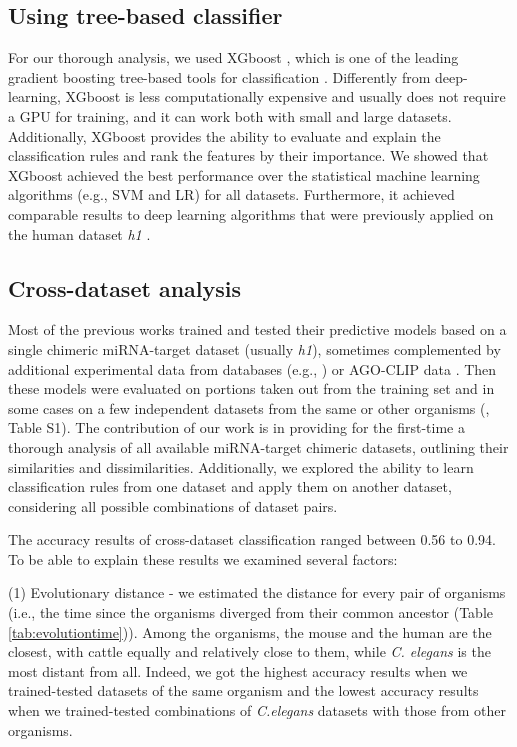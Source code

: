 \documentclass{bmcart}
\begin{document}
\subsection*{Using tree-based classifier} 
For our thorough analysis, we used XGboost \cite{xgboost}, which is one of the leading gradient boosting tree-based tools for classification \cite{nielsen2016tree}. Differently from deep-learning, XGboost is less computationally expensive and usually does not require a GPU for training, and it can work both with small and large datasets. Additionally, XGboost provides the ability to evaluate and explain the classification rules and rank the features by their importance. 
We showed that XGboost achieved the best performance over the statistical machine learning algorithms (e.g., SVM and LR) for all datasets. Furthermore, it achieved comparable results to deep learning algorithms that were previously applied on the human dataset \textit{h1} \cite{wen2018deepmirtar, lee2016deeptarget}.

\subsection*{Cross-dataset analysis}
Most of the previous works trained and tested their predictive models based on a single chimeric miRNA-target dataset (usually \textit{h1}), sometimes complemented by additional experimental data from databases (e.g., \cite{xiao2009mirecords,chou2016mirtarbase}) or AGO-CLIP data \cite{ding2016tarpmir,wen2018deepmirtar,paker2019mirlstm, lu2016learning, pla2018miraw}. Then these models were evaluated on portions taken out from the training set and in some cases on a few independent datasets from the same or other organisms  (, Table S1). 
The contribution of our work is in providing for the first-time a thorough analysis of all available miRNA-target chimeric datasets, outlining their similarities and dissimilarities. Additionally, we explored the ability to learn classification rules from one dataset and apply them on another dataset, considering all possible combinations of dataset pairs.

The accuracy results of cross-dataset classification ranged between 0.56 to 0.94. To be able to explain these results we examined several factors:

(1) Evolutionary distance - we estimated the distance for every pair of organisms (i.e., the time since the organisms diverged from their common ancestor (Table \ref{tab:evolutiontime})). Among the organisms, the mouse and the human are the closest, with cattle equally and relatively close to them, while \textit{C. elegans} is the most distant from all. Indeed, we got the highest accuracy results when we trained-tested datasets of the same organism and the lowest accuracy results when we trained-tested combinations of \textit{C.elegans} datasets with those from other organisms.
\end{document}
